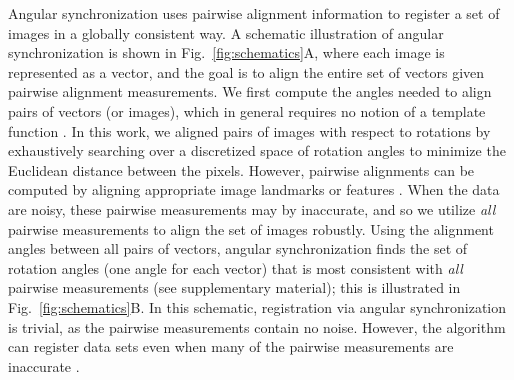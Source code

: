 \documentclass[twocolumn, 10pt]{article}
\newcommand{\SI}[0]{supplementary material}
\newcommand{\fig}[0]{Fig.}
\begin{document}
Angular synchronization uses pairwise alignment information to register a set of images in a globally consistent way.
%
A schematic illustration of angular synchronization is shown in \fig~\ref{fig:schematics}A, where each image is represented as a vector, and the goal is to align the entire set of vectors given pairwise alignment measurements.
%
We first compute the angles needed to align pairs of vectors (or images), which in general requires no notion of a template function \citep{ahuja2007template, sonday2013noisy}.
%
In this work, we aligned pairs of images with respect to rotations by exhaustively searching over a discretized space of rotation angles to minimize the Euclidean distance between the pixels.
%
However, pairwise alignments can be computed by aligning appropriate image landmarks or features \citep{ian1998statistical}.
%
When the data are noisy, these pairwise measurements may by inaccurate, and so we utilize {\em all} pairwise measurements to align the set of images robustly.
%
Using the alignment angles between all pairs of vectors, angular synchronization finds the set of rotation angles (one angle for each vector) that is most consistent with {\it all} pairwise measurements (see \SI); this is illustrated in \fig~\ref{fig:schematics}B.
%
In this schematic, registration via angular synchronization is trivial, as the pairwise measurements contain no noise.
%
However, the algorithm can register data sets even when many of the pairwise measurements are inaccurate \citep{singer2011angular}.
\end{document}
